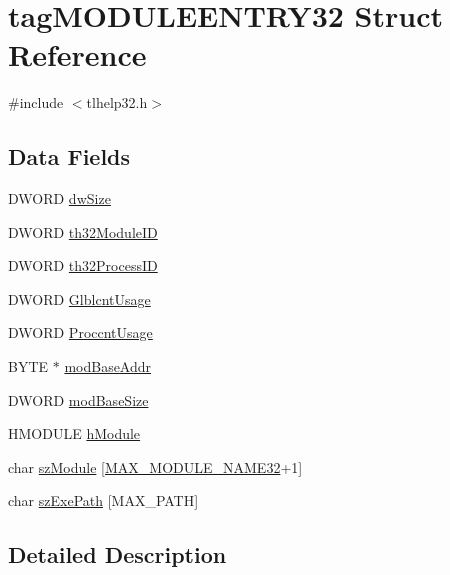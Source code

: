 \hypertarget{structtag_m_o_d_u_l_e_e_n_t_r_y32}{}\section{tag\+M\+O\+D\+U\+L\+E\+E\+N\+T\+R\+Y32 Struct Reference}
\label{structtag_m_o_d_u_l_e_e_n_t_r_y32}


{\ttfamily \#include $<$tlhelp32.\+h$>$}

\subsection*{Data Fields}
\begin{DoxyCompactItemize}
\item 
D\+W\+O\+RD \hyperlink{structtag_m_o_d_u_l_e_e_n_t_r_y32_a669c5a85f5a9eb97e64ad880fadaaa2d}{dw\+Size}
\item 
D\+W\+O\+RD \hyperlink{structtag_m_o_d_u_l_e_e_n_t_r_y32_ac028c0e590bc5c6303111ccf82c25517}{th32\+Module\+ID}
\item 
D\+W\+O\+RD \hyperlink{structtag_m_o_d_u_l_e_e_n_t_r_y32_a4e94a85eb6671f7346bc1fb284f56186}{th32\+Process\+ID}
\item 
D\+W\+O\+RD \hyperlink{structtag_m_o_d_u_l_e_e_n_t_r_y32_af5e285e8235ab5a34fae45f3b275d54e}{Glblcnt\+Usage}
\item 
D\+W\+O\+RD \hyperlink{structtag_m_o_d_u_l_e_e_n_t_r_y32_acf40e3931fdf7679a6618f584cd4686a}{Proccnt\+Usage}
\item 
B\+Y\+TE $\ast$ \hyperlink{structtag_m_o_d_u_l_e_e_n_t_r_y32_af69cbbeda18be4584784e7e289cc4dc1}{mod\+Base\+Addr}
\item 
D\+W\+O\+RD \hyperlink{structtag_m_o_d_u_l_e_e_n_t_r_y32_a98886f2c939d29359f700bea645b9cf6}{mod\+Base\+Size}
\item 
H\+M\+O\+D\+U\+LE \hyperlink{structtag_m_o_d_u_l_e_e_n_t_r_y32_ae3642ec58b041930c54b501841cc736d}{h\+Module}
\item 
char \hyperlink{structtag_m_o_d_u_l_e_e_n_t_r_y32_ad3a4a8a7917fd8c3717062d9741499fc}{sz\+Module} \mbox{[}\hyperlink{tlhelp32_8h_af49cb1543478a8a476fdff338f27e478}{M\+A\+X\+\_\+\+M\+O\+D\+U\+L\+E\+\_\+\+N\+A\+M\+E32}+1\mbox{]}
\item 
char \hyperlink{structtag_m_o_d_u_l_e_e_n_t_r_y32_af9188a9b3d822b6f0a2767cbbfac0e21}{sz\+Exe\+Path} \mbox{[}M\+A\+X\+\_\+\+P\+A\+TH\mbox{]}
\end{DoxyCompactItemize}


\subsection{Detailed Description}


